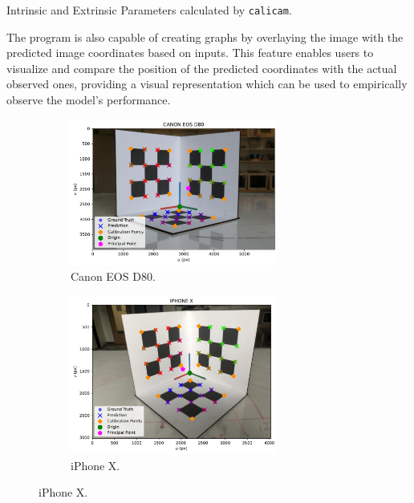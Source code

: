 \begin{table}[H]
    \centering
    
    \caption{Intrinsic and Extrinsic Parameters calculated by \texttt{calicam}.}
\end{table}

The program is also capable of creating graphs by overlaying the image with the predicted image coordinates based on inputs. This feature enables users to visualize and compare the position of the predicted coordinates with the actual observed ones, providing a visual representation which can be used to empirically observe the model's performance.

\begin{figure}[H]
    \centering
    \begin{subfigure}{\textwidth}
        \centering
        \includegraphics[width=0.75\textwidth]{assets/results/CANON EOS D80/graph.pdf}
        \caption{Canon EOS D80.}
    \end{subfigure}
    \begin{subfigure}{\textwidth}
        \centering
        \includegraphics[width=0.75\textwidth]{assets/results/IPHONE X/graph.pdf}
        \caption{iPhone X.}
    \end{subfigure}
\end{figure}
